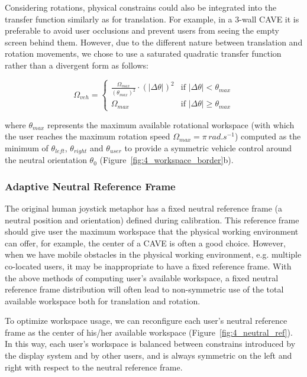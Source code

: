 Considering rotations, physical constrains could also be integrated into the transfer function similarly as for translation. For example, in a 3-wall CAVE it is preferable to avoid user occlusions and prevent users from seeing the empty screen behind them. However, due to the different nature between translation and rotation movements, we chose to use a saturated quadratic transfer function rather than a divergent form as follows:

\begin{equation}
\Omega_{veh}=
  \begin{cases}
    \frac{\Omega_{max}}{(\theta_{max})^{2}}\cdot(|\Delta\theta|)^{2} & \text{if } |\Delta\theta|<\theta_{max} \\
    \Omega_{max} & \text{if } |\Delta\theta| \geq \theta_{max}
  \end{cases}
\end{equation}

where $\theta_{max}$ represents the maximum available rotational workspace (with which the user reaches the maximum rotation speed $\Omega_{max}=\pi\, rad.s^{-1}$) computed as the minimum of $\theta_{left}$, $\theta_{right}$ and $\theta_{user}$ to provide a symmetric vehicle control around the neutral orientation $\theta_{0}$ (Figure~\ref{fig:4_workspace_border}b).  


\subsubsection{Adaptive Neutral Reference Frame}

The original human joystick metaphor has a fixed neutral reference frame (a neutral position and orientation) defined during calibration. This reference frame should give user the maximum workspace that the physical working environment can offer, for example, the center of a CAVE is often a good choice. However, when we have mobile obstacles in the physical working environment, e.g. multiple co-located users, it may be inappropriate to have a fixed reference frame. With the above methods of computing user's available workspace, a fixed neutral reference frame distribution will often lead to non-symmetric use of the total available workspace both for translation and rotation.

To optimize workspace usage, we can reconfigure each user's neutral reference frame as the center of his/her available workspace (Figure~\ref{fig:4_neutral_ref}). In this way, each user's workspace is balanced between constrains introduced by the display system and by other users, and is always symmetric on the left and right with respect to the neutral reference frame.

